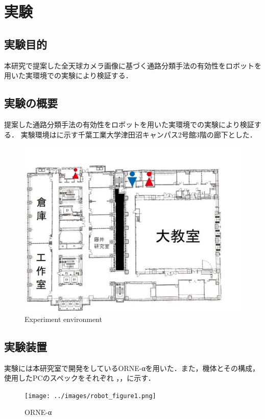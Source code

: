 \documentclass[../main]{subfiles}
\begin{document}
\setcounter{secnumdepth}{3}
    \chapter{実験}
    \section{実験目的}
        本研究で提案した全天球カメラ画像に基づく通路分類手法の有効性をロボットを用いた実環境での実験により検証する．
    \section{実験の概要}
        提案した通路分類手法の有効性をロボットを用いた実環境での実験により検証する．
        実験環境はに示す千葉工業大学津田沼キャンパス2号館3階の廊下とした．
        \begin{figure}[H]
         \centering
         \includegraphics[width=15cm]{../images/MAP_Tsudanuma2-3.png}
         \caption{Experiment environment}
         \label{figure::3floor_map}
        \end{figure}

    \section{実験装置}
        実験には本研究室で開発をしているORNE-αを用いた．また，機体とその構成，使用したPCのスペックをそれぞれ
        ，，に示す．

        \begin{figure}[H]
        \centering
        \texttt{[image: ../images/robot\_figure1.png]}
        \caption{ORNE-α}
        \label{figure::robot_image}
        \end{figure}
\end{document}
